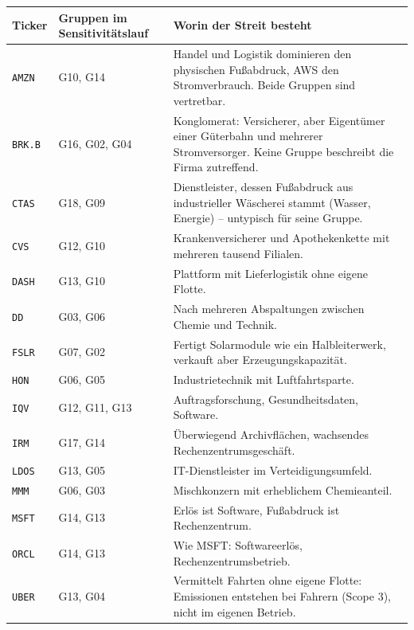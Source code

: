 \begin{tabularx}{\linewidth}{@{}l l X@{}}
\toprule
Ticker & Gruppen im Sensitivitätslauf & Worin der Streit besteht \\
\midrule
\texttt{AMZN} & G10, G14 & Handel und Logistik dominieren den physischen Fußabdruck, AWS den Stromverbrauch. Beide Gruppen sind vertretbar. \\
\texttt{BRK.B} & G16, G02, G04 & Konglomerat: Versicherer, aber Eigentümer einer Güterbahn und mehrerer Stromversorger. Keine Gruppe beschreibt die Firma zutreffend. \\
\texttt{CTAS} & G18, G09 & Dienstleister, dessen Fußabdruck aus industrieller Wäscherei stammt (Wasser, Energie) -- untypisch für seine Gruppe. \\
\texttt{CVS} & G12, G10 & Krankenversicherer und Apothekenkette mit mehreren tausend Filialen. \\
\texttt{DASH} & G13, G10 & Plattform mit Lieferlogistik ohne eigene Flotte. \\
\texttt{DD} & G03, G06 & Nach mehreren Abspaltungen zwischen Chemie und Technik. \\
\texttt{FSLR} & G07, G02 & Fertigt Solarmodule wie ein Halbleiterwerk, verkauft aber Erzeugungskapazität. \\
\texttt{HON} & G06, G05 & Industrietechnik mit Luftfahrtsparte. \\
\texttt{IQV} & G12, G11, G13 & Auftragsforschung, Gesundheitsdaten, Software. \\
\texttt{IRM} & G17, G14 & Überwiegend Archivflächen, wachsendes Rechenzentrumsgeschäft. \\
\texttt{LDOS} & G13, G05 & IT-Dienstleister im Verteidigungsumfeld. \\
\texttt{MMM} & G06, G03 & Mischkonzern mit erheblichem Chemieanteil. \\
\texttt{MSFT} & G14, G13 & Erlös ist Software, Fußabdruck ist Rechenzentrum. \\
\texttt{ORCL} & G14, G13 & Wie MSFT: Softwareerlös, Rechenzentrumsbetrieb. \\
\texttt{UBER} & G13, G04 & Vermittelt Fahrten ohne eigene Flotte: Emissionen entstehen bei Fahrern (Scope 3), nicht im eigenen Betrieb. \\
\bottomrule
\end{tabularx}

